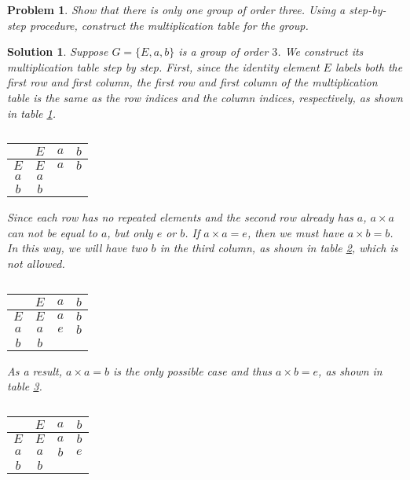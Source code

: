 \documentclass[UTF8,10pt,a4paper]{article}
\theoremstyle{Problem}
\newtheorem{prob}{Problem}
\theoremstyle{Solution}
\newtheorem*{sol}{Solution}
\begin{document}
\begin{prob}
    Show that there is only one group of order three. Using a step-by-step procedure, construct the multiplication table for the group.
\end{prob}
\begin{sol}
    Suppose $G=\{E,a,b\}$ is a group of order $3$. We construct its multiplication table step by step. First, since the identity element $E$ labels both the first row and first column, the first row and first column of the multiplication table is the same as the row indices and the column indices, respectively, as shown in table \ref{3-multiplication-table-1}.
    \begin{table}[h]
        \centering
        \caption{}
        \label{3-multiplication-table-1}
        \begin{tabular}{c|ccc}
                & $E$ & $a$ & $b$ \\ \hline
            $E$ & $E$ & $a$ & $b$ \\
            $a$ & $a$ &     &     \\
            $b$ & $b$ &     &
        \end{tabular}
    \end{table}

    Since each row has no repeated elements and the second row already has $a$, $a\times a$ can not be equal to $a$, but only $e$ or $b$. If $a\times a=e$, then we must have $a\times b=b$. In this way, we will have two $b$ in the third column, as shown in table \ref{3-multiplication-table-2}, which is not allowed.
    \begin{table}[h]
        \centering
        \caption{}
        \label{3-multiplication-table-2}
        \begin{tabular}{c|ccc}
                & $E$ & $a$ & $b$ \\ \hline
            $E$ & $E$ & $a$ & $b$ \\
            $a$ & $a$ & $e$ & $b$ \\
            $b$ & $b$ &     &
        \end{tabular}
    \end{table}
    \newpage
    As a result, $a\times a=b$ is the only possible case and thus $a\times b=e$, as shown in table \ref{3-multiplication-table-3}.
    \begin{table}[h]
        \centering
        \caption{}
        \label{3-multiplication-table-3}
        \begin{tabular}{c|ccc}
                & $E$ & $a$ & $b$ \\ \hline
            $E$ & $E$ & $a$ & $b$ \\
            $a$ & $a$ & $b$ & $e$ \\
            $b$ & $b$ &     &
        \end{tabular}
    \end{table}


\end{sol}
\end{document}
